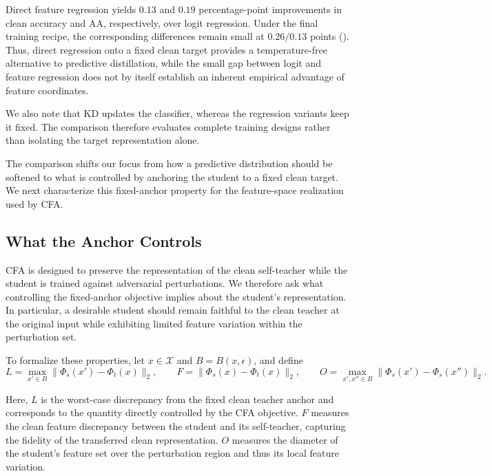 \documentclass{article} %
\theoremstyle{plain}
\begin{document}
Direct feature regression yields \(0.13\) and \(0.19\) percentage-point
improvements in clean accuracy and AA, respectively, over logit regression.
Under the final training recipe, the corresponding differences remain small
at \(0.26/0.13\) points ().
Thus, direct regression onto a fixed clean target provides a temperature-free
alternative to predictive distillation, while the small gap between logit and
feature regression does not by itself establish an inherent empirical
advantage of feature coordinates.

We also note that KD updates the classifier, whereas the regression variants
keep it fixed.
The comparison therefore evaluates complete training designs rather than
isolating the target representation alone.

\label{sec:sole_target}

The comparison shifts our focus from how a predictive distribution should be
softened to what is controlled by anchoring the student to a fixed clean
target.
We next characterize this fixed-anchor property for the feature-space
realization used by CFA.


\subsection{What the Anchor Controls}
\label{sec:decomp}

CFA is designed to preserve the representation of the clean self-teacher
while the student is trained against adversarial perturbations.
We therefore ask what controlling the fixed-anchor objective implies about
the student's representation.
In particular, a desirable student should remain faithful to the clean
teacher at the original input while exhibiting limited feature variation
within the perturbation set.

To formalize these properties, let \(x\in\mathcal X\) and
\(B=B(x,\epsilon)\), and define
\begin{equation}
L
=
\max_{x'\in B}
\lVert\Phi_s(x')-\Phi_t(x)\rVert_2,
\qquad
F
=
\lVert\Phi_s(x)-\Phi_t(x)\rVert_2,
\qquad
O
=
\max_{x',x''\in B}
\lVert\Phi_s(x')-\Phi_s(x'')\rVert_2.
\label{eqn:LFO}
\end{equation}

Here, \(L\) is the worst-case discrepancy from the fixed clean teacher anchor
and corresponds to the quantity directly controlled by the CFA objective.
\(F\) measures the clean feature discrepancy between the student and its
self-teacher, capturing the fidelity of the transferred clean representation.
\(O\) measures the diameter of the student's feature set over the perturbation
region and thus its local feature variation.
\end{document}
